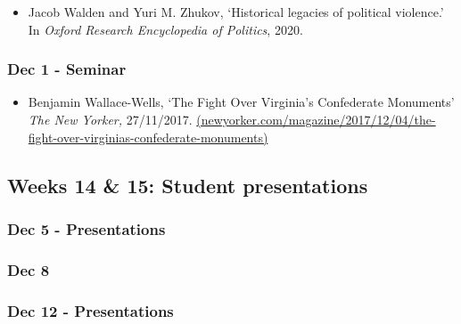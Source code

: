 \documentclass[12pt, a4paper]{article}
\begin{document}
\begin{itemize}
\setlength\itemsep{0pt}
\item Jacob Walden and Yuri M. Zhukov, `Historical legacies of political violence.' In \textit{Oxford Research Encyclopedia of Politics}, 2020.
\end{itemize}

\subsubsection*{Dec 1 - Seminar}

\begin{itemize}
\setlength\itemsep{0pt}
\item Benjamin Wallace-Wells, `The Fight Over Virginia’s Confederate Monuments' \textit{The New Yorker,} 27/11/2017. \href{https://www.newyorker.com/magazine/2017/12/04/the-fight-over-virginias-confederate-monuments}{(newyorker.com/magazine/2017/12/04/the-fight-over-virginias-confederate-monuments)}
\end{itemize}



\hline %

\subsection*{Weeks 14 \& 15: Student presentations}

\subsubsection*{Dec 5 - Presentations}

\subsubsection*{Dec 8 {}}

\subsubsection*{Dec 12 - Presentations}
\end{document}
